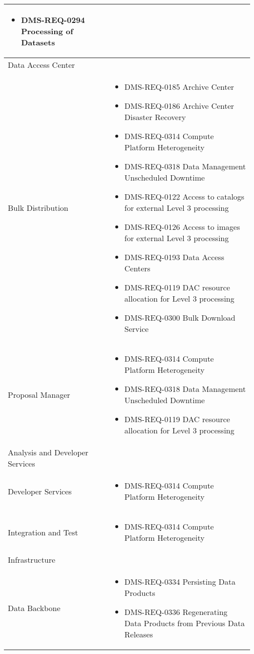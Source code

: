 \begin{xtabular}{lp{0.7\textwidth}}
\begin{itemize}
\item DMS-REQ-0294 Processing of Datasets
\end{itemize} \\ \hline
Data Access Center &
\\ \hline
Bulk Distribution &
\begin{itemize}
\item DMS-REQ-0185 Archive Center
\item DMS-REQ-0186 Archive Center Disaster Recovery
\item DMS-REQ-0314 Compute Platform Heterogeneity
\item DMS-REQ-0318 Data Management Unscheduled Downtime
\item DMS-REQ-0122 Access to catalogs for external Level 3 processing
\item DMS-REQ-0126 Access to images for external Level 3 processing
\item DMS-REQ-0193 Data Access Centers
\item DMS-REQ-0119 DAC resource allocation for Level 3 processing
\item DMS-REQ-0300 Bulk Download Service
\end{itemize} \\ \hline
Proposal Manager &
\begin{itemize}
\item DMS-REQ-0314 Compute Platform Heterogeneity
\item DMS-REQ-0318 Data Management Unscheduled Downtime
\item DMS-REQ-0119 DAC resource allocation for Level 3 processing
\end{itemize} \\ \hline
Analysis and Developer Services &
\\ \hline
Developer Services &
\begin{itemize}
\item DMS-REQ-0314 Compute Platform Heterogeneity
\end{itemize} \\ \hline
Integration and Test &
\begin{itemize}
\item DMS-REQ-0314 Compute Platform Heterogeneity
\end{itemize} \\ \hline
Infrastructure &
\\ \hline
Data Backbone &
\begin{itemize}
\item DMS-REQ-0334 Persisting Data Products
\item DMS-REQ-0336 Regenerating Data Products from Previous Data Releases

\end{itemize}
\end{xtabular}
